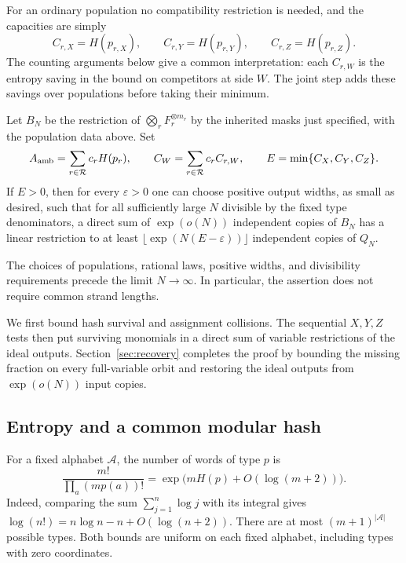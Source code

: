 For an ordinary population no compatibility restriction is needed,
and the capacities are simply
\[
 C_{r,X}=H(p_{r,X}),\qquad C_{r,Y}=H(p_{r,Y}),\qquad
 C_{r,Z}=H(p_{r,Z}).
\]
The counting arguments below give a common interpretation: each
$C_{r,W}$ is the entropy saving in the bound on competitors at side $W$.
The joint step adds these savings over populations before taking their
minimum.

\begin{theorem}\label{thm:joint-step}
Let $B_N$ be the restriction of $\bigotimes_r F_r^{\otimes m_r}$
by the inherited masks just specified, with the population data above.  Set
\begin{equation}\label{eq:joint-totals}
 A_{\rm amb}=\sum_{r\in\mathcal R}c_rH(p_r),\qquad
 C_W=\sum_{r\in\mathcal R}c_rC_{r,W},\qquad
 E=\min\{C_X,C_Y,C_Z\}.
\end{equation}
If $E>0$, then for every $\varepsilon>0$ one can choose positive
output widths, as small as desired, such that for all sufficiently
large $N$ divisible by the fixed type denominators, a direct sum of
$\exp(o(N))$ independent copies of $B_N$ has a linear restriction
to at least $\lfloor\exp(N(E-\varepsilon))\rfloor$ independent
copies of $Q_N$.

The choices of populations, rational laws, positive widths, and
divisibility requirements precede the limit $N\to\infty$.
In particular, the assertion does not require common strand lengths.
\end{theorem}

We first bound hash survival and assignment collisions.  The sequential
$X,Y,Z$ tests then put surviving monomials in a direct sum of variable
restrictions of the ideal outputs.  Section~\ref{sec:recovery} completes
the proof by bounding the missing fraction on every full-variable orbit
and restoring the ideal outputs from $\exp(o(N))$ input copies.

\subsection{Entropy and a common modular hash}

For a fixed alphabet $\mathcal A$, the number of words of type $p$ is
\begin{equation}\label{eq:type-count}
 \frac{m!}{\prod_a(mp(a))!}
   =\exp\bigl(mH(p)+O(\log(m+2))\bigr).
\end{equation}
Indeed, comparing the sum $\sum_{j=1}^n\log j$ with its integral
gives $\log(n!)=n\log n-n+O(\log(n+2))$.
There are at most $(m+1)^{|\mathcal A|}$ possible types.
Both bounds are uniform on each fixed alphabet, including types
with zero coordinates.

